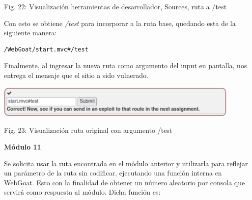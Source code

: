 \documentclass[12pt,oneside,a4paper]{book}
\begin{document}
\begin{enumerate}
\begin{enumerate}
\begin{center}
            \vspace{0.1em}
            
            Fig. 22: Visualización herramientas de desarrollador, Sources, ruta a /test
        \end{center}
        
        \vspace{2em}

        \hspace{20pt}
        Con esto se obtiene \textit{/test} para incorporar a la ruta base, quedando esta de la siguiente manera:

        \vspace{1em}

        \begin{verbatim}
/WebGoat/start.mvc#/test
        \end{verbatim}

        \hspace{20pt}
        Finalmente, al ingresar la nueva ruta como argumento del input en pantalla, nos entrega el mensaje que el sitio a sido vulnerado.

        \newpage

        \begin{center}
            \includegraphics[width=12cm]{img/xss9.png}
            
            \vspace{0.1em}
            
            Fig. 23: Visualización ruta original con argumento /test
        \end{center}
        
        \vspace{2em}

        \textbf{Módulo 11}
        
        \vspace{1em}

        \hspace{20pt}
        Se solicita usar la ruta encontrada en el módulo anterior y utilizarla para reflejar un parámetro de la ruta sin codificar, ejecutando una función interna en WebGoat. Esto con la finalidad de obtener un número aleatorio por consola que servirá como respuesta al módulo. Dicha función es:
        

\end{enumerate}
\end{enumerate}
\end{document}
